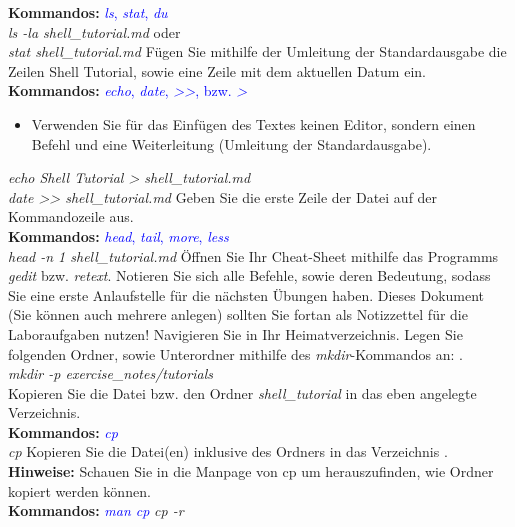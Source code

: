 \documentclass[paper=a4,fontsize=11pt]{scrartcl}%
\numberwithin{equation}{section}
\begin{document}
{\begin{enumerate}
\begin{tasks}
		\textbf{Kommandos:} \textcolor{blue}{\emph{ls}, \emph{stat}, \emph{du}}\\
		\textit{ls -la shell\_tutorial.md} oder\\
		\textit{stat shell\_tutorial.md}
		\task Fügen Sie mithilfe der Umleitung der Standardausgabe die Zeilen \glqq Shell Tutorial\grqq, sowie eine Zeile mit dem aktuellen Datum ein.\\
		\textbf{Kommandos:} \textcolor{blue}{\emph{echo}, \emph{date}, \emph{>>}, bzw. \emph{>}}
		\begin{itemize}
			\item \small Verwenden Sie für das Einfügen des Textes keinen Editor, sondern einen Befehl und eine Weiterleitung (Umleitung der Standardausgabe).
		\end{itemize}
		\textit{echo Shell Tutorial > shell\_tutorial.md}\\
		\textit{date >> shell\_tutorial.md}
		\task Geben Sie die erste Zeile der Datei auf der Kommandozeile aus.\\
		\textbf{Kommandos:} \textcolor{blue}{\emph{head}, \emph{tail}, \emph{more}, \emph{less}}\\
		\textit{head -n 1 shell\_tutorial.md}
		\task Öffnen Sie Ihr Cheat-Sheet mithilfe das Programms \emph{gedit} bzw. \emph{retext}. Notieren Sie sich alle Befehle, sowie deren Bedeutung, sodass Sie eine erste Anlaufstelle für die nächsten Übungen haben. Dieses Dokument (Sie können auch mehrere anlegen) sollten Sie fortan als Notizzettel für die Laboraufgaben nutzen!
		\task Navigieren Sie in Ihr Heimatverzeichnis. Legen Sie folgenden Ordner, sowie Unterordner mithilfe des \emph{mkdir}-Kommandos an: .\\
		\textit{mkdir -p exercise\_notes/tutorials}\\
		\task Kopieren Sie die Datei bzw. den Ordner \emph{shell\_tutorial} in das eben angelegte Verzeichnis.\\
		\textbf{Kommandos:} \textcolor{blue}{\emph{cp}}\\
			\textit{cp   }
        \task Kopieren Sie die Datei(en) inklusive des Ordners  in das Verzeichnis .\\
        \textbf{Hinweise:} Schauen Sie in die Manpage von cp um herauszufinden, wie Ordner kopiert werden können.\\
        \textbf{Kommandos:} \textcolor{blue}{\emph{man cp}}
		\textit{cp -r  }

\end{tasks}
\end{enumerate}}
\end{document}
